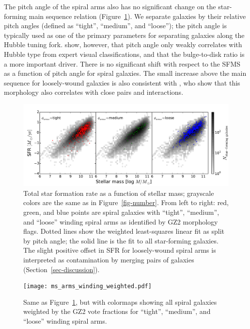 \documentclass[useAMS,usenatbib]{mn2e}
\begin{document}
The pitch angle of the spiral arms also has no significant change on the star-forming main sequence relation (Figure~\ref{fig-winding}). We separate galaxies by their relative pitch angles (defined as ``tight'', ``medium'', and ``loose''); the pitch angle is typically used as one of the primary parameters for separating galaxies along the Hubble tuning fork. \citet{wil13} show, however, that pitch angle only weakly correlates with Hubble type from expert visual classifications, and that the bulge-to-disk ratio is a more important driver. There is no significant shift with respect to the SFMS as a function of pitch angle for spiral galaxies. The small increase above the main sequence for loosely-wound galaxies is also consistent with \citet{cas13}, who show that this morphology also correlates with close pairs and interactions. 

\begin{figure}
\includegraphics[angle=0,width=7.0in]{ms_arms_winding.pdf}
\caption{Total star formation rate as a function of stellar mass; grayscale colors are the same as in Figure~\ref{fig-number}. From left to right: red, green, and blue points are spiral galaxies with ``tight'', ``medium'', and ``loose'' winding spiral arms as identified by GZ2 morphology flags. Dotted lines show the weighted least-squares linear fit as split by pitch angle; the solid line is the fit to all star-forming galaxies. The slight positive offset in SFR for loosely-wound spiral arms is interpreted as contamination by merging pairs of galaxies (Section~\ref{sec-discussion}).
\label{fig-winding}}
\end{figure}

\begin{figure}
\texttt{[image: ms\_arms\_winding\_weighted.pdf]}
\caption{Same as Figure~\ref{fig-winding}, but with colormaps showing all spiral galaxies weighted by the GZ2 vote fractions for ``tight'', ``medium'', and ``loose'' winding spiral arms. 
\label{fig-winding_weighted}}
\end{figure}
\end{document}

